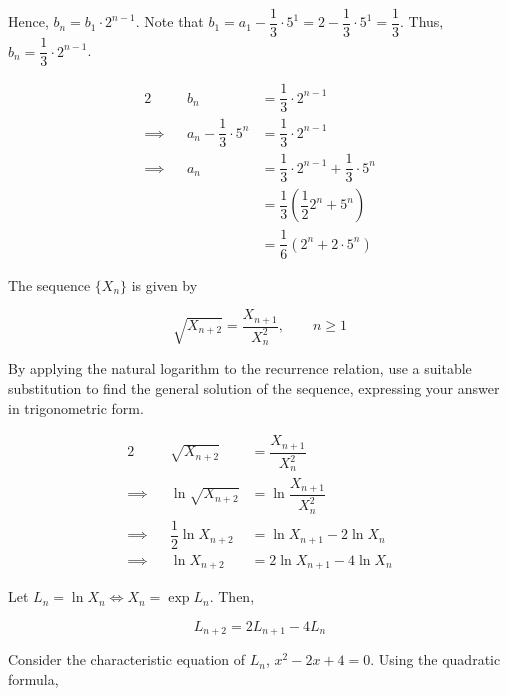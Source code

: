 \documentclass{jhwhw}
\begin{document}
            Hence, $b_n = b_1 \cdot 2^{n-1}$. Note that $b_1 = a_1 - \dfrac13 \cdot 5^1 = 2 - \dfrac13 \cdot 5^1 = \dfrac13$. Thus, $b_n = \dfrac13 \cdot 2^{n-1}$.

            \begin{alignat*}{2}
                &&b_n &= \dfrac13 \cdot 2^{n-1}\\
                \implies&&a_n - \dfrac13 \cdot 5^n &= \dfrac13 \cdot 2^{n-1}\\
                \implies&&a_n &= \dfrac13 \cdot 2^{n-1} + \dfrac13 \cdot 5^n\\
                && &= \dfrac13 \left(\dfrac12 2^n + 5^n \right)\\
                && &= \dfrac16 \left(2^n + 2 \cdot 5^n \right)
            \end{alignat*}


    \problem{}
        The sequence $\{X_n\}$ is given by

        \begin{equation*}
            \sqrt{X_{n+2}} = \dfrac{X_{n+1}}{X_n^2}, \qquad n \geq 1
        \end{equation*}

        \noindent By applying the natural logarithm to the recurrence relation, use a suitable substitution to find the general solution of the sequence, expressing your answer in trigonometric form.

    \solution
        \begin{alignat*}{2}
            &&\sqrt{X_{n+2}} &= \dfrac{X_{n+1}}{X_n^2}\\
            \implies&&\ln \sqrt{X_{n+2}} &= \ln \dfrac{X_{n+1}}{X_n^2}\\
            \implies&&\dfrac12 \ln X_{n+2} &= \ln X_{n+1} - 2 \ln X_n\\
            \implies&&\ln X_{n+2} &= 2\ln X_{n+1} - 4\ln X_n
        \end{alignat*}

        Let $L_n = \ln X_n \iff X_n = \exp{L_n}$. Then,

        \begin{equation*}
            L_{n+2} = 2L_{n+1} - 4L_n
        \end{equation*}

        Consider the characteristic equation of $L_n$, $x^2 - 2x + 4 = 0$. Using the quadratic formula,
\end{document}

